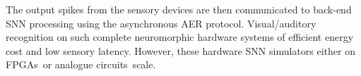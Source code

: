 The output spikes from the sensory devices are then communicated to back-end SNN processing using the asynchronous AER protocol.
Visual/auditory recognition on such complete neuromorphic hardware systems \DIFdelbegin {}\DIFdelend \DIFaddbegin {}\DIFaddend of efficient energy cost and low sensory latency.
However, these hardware SNN simulators either \DIFdelbegin {}\DIFdelend \DIFaddbegin {}\DIFaddend on FPGAs~\DIFdelbegin {}\DIFdelend \DIFaddbegin {}\DIFaddend or analogue circuits~\DIFdelbegin {}\DIFdelend \DIFaddbegin {}\DIFaddend scale.

